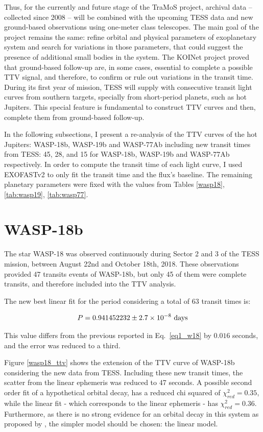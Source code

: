 Thus, for the currently and future stage of the TraMoS project, archival data -- collected since 2008 -- will be combined with the upcoming TESS data and new ground-based observations using one-meter class telescopes. The main goal of the project remains the same: refine orbital and physical parameters of exoplanetary system and search for variations in those parameters, that could suggest the presence of additional small bodies in the system. The KOINet project proved that ground-based follow-up are, in some cases, essential to complete a possible TTV signal, and therefore, to confirm or rule out variations in the transit time. During its first year of mission, TESS will supply with consecutive transit light curves from southern targets, specially from short-period planets, such as hot Jupiters. This special feature is fundamental to construct TTV curves and then, complete them from ground-based follow-up.

In the following subsections, I present a re-analysis of the TTV curves of the hot Jupiters: WASP-18b, WASP-19b and WASP-77Ab including new transit times from TESS: 45, 28, and 15 for WASP-18b, WASP-19b and WASP-77Ab respectively. In order to compute the transit time of each light curve, I used EXOFASTv2 to only fit the transit time and the flux's baseline. The remaining planetary parameters were fixed with the values from Tables \ref{wasp18}, \ref{tab:wasp19}, \ref{tab:wasp77}.

\section{WASP-18b}

The star WASP-18 was observed continuously during Sector 2 and 3 of the TESS mission, between August 22nd and October 18th, 2018. These observations provided 47 transits events of WASP-18b, but only 45 of them were complete transits, and therefore included into the TTV analysis. 

The new best linear fit for the period considering a total of 63 transit times is:

\begin{equation}
P = 0.941452232 \pm 2.7\times10^{-8} ~\rm days
\end{equation}

This value differs from the previous reported in Eq.~\ref{eq1_w18} by $0.016$ seconds, and the error was reduced to a third.

Figure \ref{wasp18_ttv} shows the extension of the TTV curve of WASP-18b considering the new data from TESS. Including these new transit times, the scatter from the linear ephemeris was reduced to 47 seconds. A possible second order fit of a hypothetical orbital decay, has a reduced chi squared of $\chi^{2}_{red}=0.35$, while the linear fit - which corresponds to the linear ephemeris - has $\chi^{2}_{red}=0.36$. Furthermore, as there is no strong evidence for an orbital decay in this system as proposed by \cite{Wilkins2017}, the simpler model should be chosen: the linear model.

